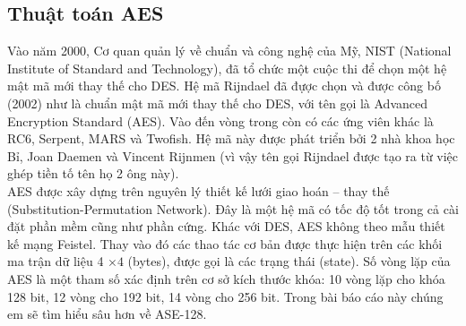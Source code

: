 \subsection{Thuật toán AES}
Vào năm 2000, Cơ quan quản lý về chuẩn và công nghệ của Mỹ, NIST (National Institute of Standard and Technology), đã tổ chức một cuộc thi để chọn một hệ mật mã mới thay thế cho DES. Hệ mã Rijndael đã đựợc chọn và được công bố (2002) như là chuẩn mật mã mới thay thế cho DES, với tên gọi là Advanced Encryption Standard (AES). Vào đến vòng trong còn có các ứng viên khác là RC6, Serpent, MARS và Twofish. Hệ mã này được phát triển bởi 2 nhà khoa học Bỉ, Joan Daemen và Vincent Rijnmen (vì vậy tên gọi Rijndael được tạo ra từ việc ghép tiền tố tên họ 2 ông này).\\
\indent AES được xây dựng trên nguyên lý thiết kế lưới giao hoán – thay thế (Substitution-Permutation Network). Đây là một hệ mã có tốc độ tốt trong cả cài đặt phần mềm cũng như phần cứng. Khác với DES, AES không theo mẫu thiết kế mạng Feistel. Thay vào đó các thao tác cơ bản được thực hiện trên các khối ma trận dữ liệu 4 $\times 4$ (bytes), được gọi là các trạng thái (state). Số vòng lặp của AES là một tham số xác định trên cơ sở kích thước khóa: 10 vòng lặp cho khóa 128 bit, 12 vòng cho 192 bit, 14 vòng cho 256 bit. Trong bài báo cáo này chúng em sẽ tìm hiểu sâu hơn về ASE-128.

